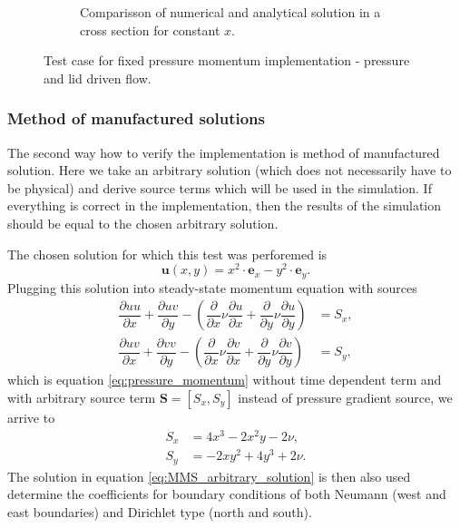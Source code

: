 \documentclass[]{article}
\begin{document}
\begin{figure}
\begin{subfigure}{.49\textwidth}
		\caption{Comparisson of numerical and analytical solution in a cross section for constant $x$.}
		\label{fig:pressuredrivenflowcross10}
	\end{subfigure}
	\caption{Test case for fixed pressure momentum implementation - pressure and lid driven flow.}
	\label{fig:pressure_and_lid_flow_figs}
\end{figure}

\subsubsection{Method of manufactured solutions}
The second way how to verify the implementation is method of manufactured solution. Here we take an arbitrary solution (which does not necessarily have to be physical) and derive source terms which will be used in the simulation. If everything is correct in the implementation, then the results of the simulation should be equal to the chosen arbitrary solution.

The chosen solution for which this test was perforemed is 
\begin{equation}\label{eq:MMS_arbitrary_solution}
\mathbf{u}(x,y) = x^2 \cdot \mathbf{e}_x - y^2 \cdot \mathbf{e}_y.
\end{equation}
Plugging this solution into steady-state momentum equation with sources
\begin{align}
\dfrac{\partial u u}{\partial x} + \dfrac{\partial u v}{\partial y} - \left( \dfrac{\partial}{\partial x}\nu\dfrac{\partial u}{\partial x} + \dfrac{\partial}{\partial y}\nu \dfrac{\partial u}{\partial y} \right) &= S_x, \\
\dfrac{\partial u v}{\partial x} + \dfrac{\partial v v}{\partial y} - \left( \dfrac{\partial}{\partial x}\nu\dfrac{\partial v}{\partial x} + \dfrac{\partial}{\partial y}\nu \dfrac{\partial v}{\partial y} \right) &= S_y,
\end{align}
which is equation \ref{eq:pressure_momentum} without time dependent term and with arbitrary source term $ \mathbf{S} = \left[ S_x, S_y \right] $ instead of pressure gradient source, we arrive to
\begin{align}
S_x& = 4x^3 - 2x^2y -2 \nu, \\
S_y& = -2xy^2 + 4y^3 +2 \nu.
\end{align}
The solution in equation \ref{eq:MMS_arbitrary_solution} is then also used determine the coefficients for boundary conditions of both Neumann (west and east boundaries) and Dirichlet type (north and south).
\end{document}
